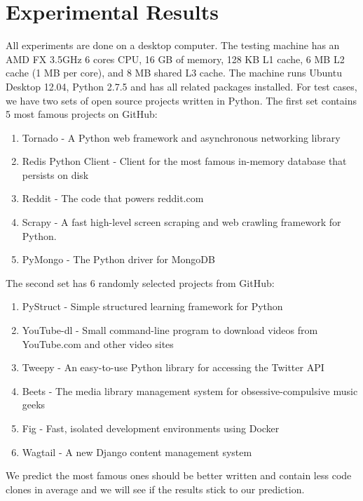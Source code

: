 \documentclass{acm_proc_article-sp}
\begin{document}
\section{Experimental Results}
All experiments are done on a desktop computer. The testing machine has an AMD FX 3.5GHz 6 cores CPU, 16 GB of memory,
128 KB L1 cache, 6 MB L2 cache (1 MB per core), and 8 MB shared L3 cache. The machine runs Ubuntu Desktop 12.04, Python
2.7.5 and has all related packages installed.
For test cases, we have two sets of open source projects written in Python. The first set contains 5 most famous projects on GitHub:
\begin{enumerate}
\item Tornado - A Python web framework and asynchronous networking library
\item Redis Python Client - Client for the most famous in-memory database that persists on disk
\item Reddit - The code that powers reddit.com
\item Scrapy - A fast high-level screen scraping and web crawling framework for Python.
\item PyMongo - The Python driver for MongoDB
\end{enumerate} 

The second set has 6 randomly selected projects from GitHub:
\begin{enumerate}
\item PyStruct - Simple structured learning framework for Python
\item YouTube-dl - Small command-line program to download videos from YouTube.com and other video sites
\item Tweepy - An easy-to-use Python library for accessing the Twitter API
\item Beets - The media library management system for obsessive-compulsive music geeks
\item Fig - Fast, isolated development environments using Docker
\item Wagtail - A new Django content management system
\end{enumerate}

We predict the most famous ones should be better written and contain less code clones in average and we will see if the results stick to our prediction.
\end{document}
